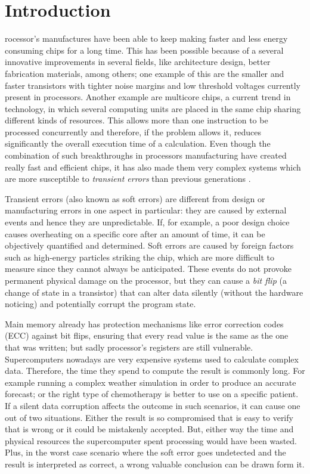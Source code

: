 %
%
\let\textcircled=\pgftextcircled
\chapter{Introduction}
\label{chap:intro}

rocessor's manufactures have been able to keep making faster and less energy consuming chips for a long time. This has been possible because of a several innovative improvements in several fields, like architecture design, better fabrication materials, among others; one example of this are the smaller and faster transistors with tighter noise margins and low threshold voltages currently present in processors. Another example are multicore chips, a current trend in technology, in which several computing units are placed in the same chip sharing different kinds of resources. This allows more than one instruction to be processed concurrently and therefore, if the problem allows it, reduces significantly the overall execution time of a calculation. Even though the combination of such breakthroughs in processors manufacturing have created really fast and efficient chips, it has also made them very complex systems which are more susceptible to \textit{transient errors} than previous generations \cite{reis2005swift}.

Transient errors (also known as soft errors) are different from design or manufacturing errors in one aspect in particular: they are caused by external events and hence they are unpredictable. If, for example, a poor design choice causes overheating on a specific core after an amount of time, it can be objectively quantified and determined. Soft errors are caused by foreign factors such as high-energy particles striking the chip, which are more difficult to measure since they cannot always be anticipated. These events do not provoke permanent physical damage on the processor, but they can cause a \textit{bit flip} (a change of state in a transistor) that can alter data silently (without the hardware noticing) and potentially corrupt the program state. 

Main memory already has protection mechanisms like error correction codes (ECC) against bit flips, ensuring that every read value is the same as the one that was written; but sadly processor's registers are still vulnerable. Supercomputers nowadays are very expensive systems used to calculate complex data. Therefore, the time they spend to compute the result is commonly long. For example running a complex weather simulation in order to produce an accurate forecast; or the right type of chemotherapy is better to use on a specific patient. If a silent data corruption affects the outcome in such scenarios, it can cause one out of two situations. Either the result is so compromised that is easy to verify that is wrong or it could be mistakenly accepted. But, either way the time and physical resources the supercomputer spent processing would have been wasted. Plus, in the worst case scenario where the soft error goes undetected and the result is interpreted as correct, a wrong valuable conclusion can be drawn form it.

